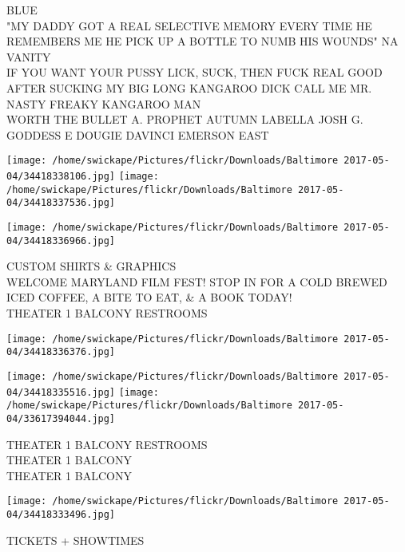 \documentclass[10pt,letterpaper]{article}
\begin{document}
BLUE\\
"MY DADDY GOT A REAL SELECTIVE MEMORY EVERY TIME HE REMEMBERS ME HE PICK UP A BOTTLE TO NUMB HIS WOUNDS" NA VANITY\\
IF YOU WANT YOUR PUSSY LICK, SUCK, THEN FUCK REAL GOOD AFTER SUCKING MY BIG LONG KANGAROO DICK CALL ME MR. NASTY FREAKY KANGAROO MAN\\
WORTH THE BULLET A. PROPHET AUTUMN LABELLA JOSH G. GODDESS E DOUGIE DAVINCI EMERSON EAST\\
\pagebreak

\texttt{[image: /home/swickape/Pictures/flickr/Downloads/Baltimore 2017-05-04/34418338106.jpg]}
\texttt{[image: /home/swickape/Pictures/flickr/Downloads/Baltimore 2017-05-04/34418337536.jpg]}

\vspace{0.25in}
\texttt{[image: /home/swickape/Pictures/flickr/Downloads/Baltimore 2017-05-04/34418336966.jpg]}

CUSTOM SHIRTS \& GRAPHICS\\
WELCOME MARYLAND FILM FEST!  STOP IN FOR A COLD BREWED ICED COFFEE, A BITE TO EAT, \& A BOOK TODAY!\\
THEATER 1 BALCONY RESTROOMS\\
\pagebreak

\texttt{[image: /home/swickape/Pictures/flickr/Downloads/Baltimore 2017-05-04/34418336376.jpg]}

\vspace{0.25in}
\texttt{[image: /home/swickape/Pictures/flickr/Downloads/Baltimore 2017-05-04/34418335516.jpg]}
\texttt{[image: /home/swickape/Pictures/flickr/Downloads/Baltimore 2017-05-04/33617394044.jpg]}

THEATER 1 BALCONY RESTROOMS\\
THEATER 1 BALCONY\\
THEATER 1 BALCONY\\
\pagebreak

\texttt{[image: /home/swickape/Pictures/flickr/Downloads/Baltimore 2017-05-04/34418333496.jpg]}

TICKETS + SHOWTIMES\\
\pagebreak
\end{document}
